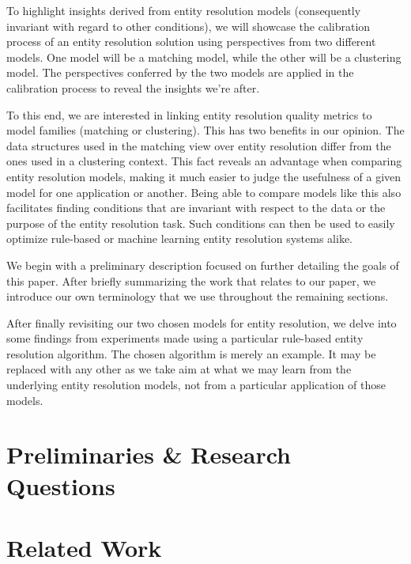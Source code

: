 \documentclass[journal]{IEEEtran}
\begin{document}
    To highlight insights derived from entity resolution models (consequently
    invariant with regard to other conditions), we will showcase the
    calibration process of an entity resolution solution using perspectives from
    two different models.
    One model will be a matching model, while the other will be a clustering
    model.
    The perspectives conferred by the two models are applied in the calibration
    process to reveal the insights we're after.

    To this end, we are interested in linking entity resolution quality metrics
    to model families (matching or clustering).
    This has two benefits in our opinion.
    The data structures used in the matching view over entity resolution differ
    from the ones used in a clustering context.
    This fact reveals an advantage when comparing entity resolution models,
    making it much easier to judge the usefulness of a given model for one
    application or another.
    Being able to compare models like this also facilitates finding conditions
    that are invariant with respect to the data or the purpose of the entity
    resolution task.
    Such conditions can then be used to easily optimize rule-based or machine
    learning entity resolution systems alike.
    
    We begin with a preliminary description focused on further detailing the
    goals of this paper.
    After briefly summarizing the work that relates to our paper, we introduce
    our own terminology that we use throughout the remaining sections.
    
    After finally revisiting our two chosen models for entity resolution, we
    delve into some findings from experiments made using a particular rule-based
    entity resolution algorithm.
    The chosen algorithm is merely an example. It may be replaced with any other
    as we take aim at what we may learn from the underlying entity resolution
    models, not from a particular application of those models.

    \section{Preliminaries \& Research Questions}\label{sec:Preliminaries & Questions}
    

    \section{Related Work}\label{sec:Related Work}
    
\end{document}
